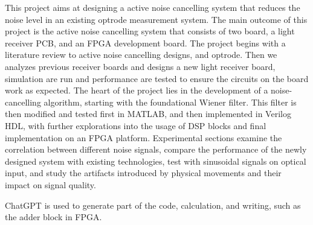 This project aims at designing a active noise cancelling system that reduces the noise level in an existing optrode measurement system. The main outcome of this project is the active noise cancelling system that consists of two board, a light receiver PCB, and an FPGA development board. The project begins with a literature review to active noise cancelling designs, and optrode.  Then we analyzes previous receiver boards and designs a new light receiver board, simulation are run and performance are tested to ensure the circuits on the board work as expected. The heart of the project lies in the development of a noise-cancelling algorithm, starting with the foundational Wiener filter. This filter is then modified and tested first in MATLAB, and then implemented in Verilog HDL, with further explorations into the usage of DSP blocks and final implementation on an FPGA platform.  Experimental sections examine the correlation between different noise signals, compare the performance of the newly designed system with existing technologies, test with sinusoidal signals on optical input, and study the artifacts introduced by physical movements and their impact on signal quality.

ChatGPT is used to generate part of the code, calculation, and writing, such as the adder block in FPGA.